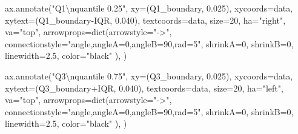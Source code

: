 \documentclass[
  letterpaper,
  DIV=11,
  numbers=noendperiod,
  oneside]{scrreprt}
\newenvironment{Shaded}{\begin{snugshade}}{\end{snugshade}}
\newcommand{\BuiltInTok}[1]{\textcolor[rgb]{0.00,0.23,0.31}{#1}}
\newcommand{\CharTok}[1]{\textcolor[rgb]{0.13,0.47,0.30}{#1}}
\newcommand{\DecValTok}[1]{\textcolor[rgb]{0.68,0.00,0.00}{#1}}
\newcommand{\FloatTok}[1]{\textcolor[rgb]{0.68,0.00,0.00}{#1}}
\newcommand{\NormalTok}[1]{\textcolor[rgb]{0.00,0.23,0.31}{#1}}
\newcommand{\OperatorTok}[1]{\textcolor[rgb]{0.37,0.37,0.37}{#1}}
\newcommand{\StringTok}[1]{\textcolor[rgb]{0.13,0.47,0.30}{#1}}
\begin{document}
\begin{Shaded}
\begin{Highlighting}[]
\NormalTok{ax.annotate(}\StringTok{"Q1}\CharTok{\textbackslash{}n}\StringTok{quantile 0.25"}\NormalTok{,}
\NormalTok{            xy}\OperatorTok{=}\NormalTok{(Q1\_boundary, }\FloatTok{0.025}\NormalTok{), xycoords}\OperatorTok{=}\StringTok{\textquotesingle{}data\textquotesingle{}}\NormalTok{,}
\NormalTok{            xytext}\OperatorTok{=}\NormalTok{(Q1\_boundary}\OperatorTok{{-}}\NormalTok{IQR, }\FloatTok{0.040}\NormalTok{), textcoords}\OperatorTok{=}\StringTok{\textquotesingle{}data\textquotesingle{}}\NormalTok{,}
\NormalTok{            size}\OperatorTok{=}\DecValTok{20}\NormalTok{,}
\NormalTok{            ha}\OperatorTok{=}\StringTok{"right"}\NormalTok{,}
\NormalTok{            va}\OperatorTok{=}\StringTok{"top"}\NormalTok{,}
\NormalTok{            arrowprops}\OperatorTok{=}\BuiltInTok{dict}\NormalTok{(arrowstyle}\OperatorTok{=}\StringTok{"{-}\textgreater{}"}\NormalTok{,}
\NormalTok{                            connectionstyle}\OperatorTok{=}\StringTok{"angle,angleA=0,angleB=90,rad=5"}\NormalTok{,}
\NormalTok{                            shrinkA}\OperatorTok{=}\DecValTok{0}\NormalTok{, shrinkB}\OperatorTok{=}\DecValTok{0}\NormalTok{,}
\NormalTok{                            linewidth}\OperatorTok{=}\FloatTok{2.5}\NormalTok{,}
\NormalTok{                            color}\OperatorTok{=}\StringTok{"black"}
\NormalTok{                            ),}
\NormalTok{            )}

\NormalTok{ax.annotate(}\StringTok{"Q3}\CharTok{\textbackslash{}n}\StringTok{quantile 0.75"}\NormalTok{,}
\NormalTok{            xy}\OperatorTok{=}\NormalTok{(Q3\_boundary, }\FloatTok{0.025}\NormalTok{), xycoords}\OperatorTok{=}\StringTok{\textquotesingle{}data\textquotesingle{}}\NormalTok{,}
\NormalTok{            xytext}\OperatorTok{=}\NormalTok{(Q3\_boundary}\OperatorTok{+}\NormalTok{IQR, }\FloatTok{0.040}\NormalTok{), textcoords}\OperatorTok{=}\StringTok{\textquotesingle{}data\textquotesingle{}}\NormalTok{,}
\NormalTok{            size}\OperatorTok{=}\DecValTok{20}\NormalTok{,}
\NormalTok{            ha}\OperatorTok{=}\StringTok{"left"}\NormalTok{,}
\NormalTok{            va}\OperatorTok{=}\StringTok{"top"}\NormalTok{,}
\NormalTok{            arrowprops}\OperatorTok{=}\BuiltInTok{dict}\NormalTok{(arrowstyle}\OperatorTok{=}\StringTok{"{-}\textgreater{}"}\NormalTok{,}
\NormalTok{                            connectionstyle}\OperatorTok{=}\StringTok{"angle,angleA=0,angleB=90,rad=5"}\NormalTok{,}
\NormalTok{                            shrinkA}\OperatorTok{=}\DecValTok{0}\NormalTok{, shrinkB}\OperatorTok{=}\DecValTok{0}\NormalTok{,}
\NormalTok{                            linewidth}\OperatorTok{=}\FloatTok{2.5}\NormalTok{,}
\NormalTok{                            color}\OperatorTok{=}\StringTok{"black"}
\NormalTok{                            ),}
\NormalTok{            )}


\end{Highlighting}
\end{Shaded}
\end{document}
